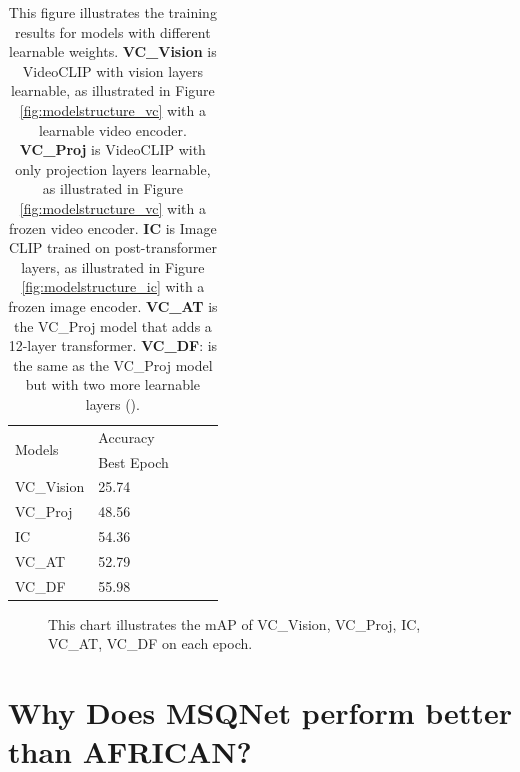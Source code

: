 \begin{table}[ht]
    \centering
    \caption[Training Results for Models with Different Learnable Weights] {This figure illustrates the training results for models with different learnable weights. \textbf{VC\_Vision} is VideoCLIP with vision layers learnable, as illustrated in Figure \ref{fig:modelstructure_vc} with a learnable video encoder. \textbf{VC\_Proj} is VideoCLIP with only projection layers learnable, as illustrated in Figure \ref{fig:modelstructure_vc} with a frozen video encoder. \textbf{IC} is Image CLIP trained on post-transformer layers, as illustrated in Figure \ref{fig:modelstructure_ic} with a frozen image encoder. \textbf{VC\_AT} is the VC\_Proj model that adds a 12-layer transformer. \textbf{VC\_DF}: is the same as the VC\_Proj model but with two more learnable layers ().}
    \label{tab:ablation_vc}
    \begin{tabular}{lllll}
        \toprule
        \multirow{2}{*}{Models} & Accuracy \\
        \cmidrule{2-2} 
        {} &  Best Epoch \\
        \midrule
        VC\_Vision & 25.74 \\
        VC\_Proj   & 48.56 \\
        IC         & 54.36 \\
        VC\_AT     & 52.79 \\
        VC\_DF     & 55.98 \\
        \bottomrule
    \end{tabular}
\end{table}

\begin{figure}[ht]
    \centering
    \resizebox{1.0\textwidth}{!}{}
    \caption[mAP of VC\_Vision, VC\_Proj, IC, VC\_AT, VC\_DF on each Epoch]{This chart illustrates the mAP of VC\_Vision, VC\_Proj, IC, VC\_AT, VC\_DF on each epoch.}
    \label{fig:ablation_vc}
\end{figure}

\section{Why Does MSQNet perform better than AFRICAN?}
\label{sec:discussion_msqnet}

